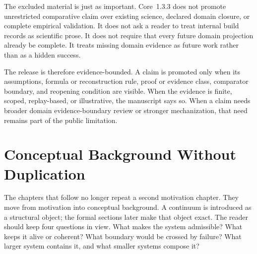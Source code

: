 The excluded material is just as important. Core~1.3.3 does not promote
unrestricted comparative claim over existing science, declared domain closure, or
complete empirical validation. It does not ask a reader to treat internal build
records as scientific prose. It does not require that every future domain
projection already be complete. It treats missing domain evidence as future
work rather than as a hidden success.

The release is therefore evidence-bounded. A claim is promoted only when its
assumptions, formula or reconstruction rule, proof or evidence class,
comparator boundary, and reopening condition are visible. When the evidence is
finite, scoped, replay-based, or illustrative, the manuscript says so. When a
claim needs broader domain evidence-boundary review or stronger mechanization, that need
remains part of the public limitation.

\section{Conceptual Background Without Duplication}
\label{sec:r012-conceptual-background}

The chapters that follow no longer repeat a second motivation chapter. They
move from motivation into conceptual background. A continuum is introduced as a
structural object; the formal sections later make that object exact. The reader
should keep four questions in view. What makes the system admissible? What keeps
it alive or coherent? What boundary would be crossed by failure? What larger
system contains it, and what smaller systems compose it?


